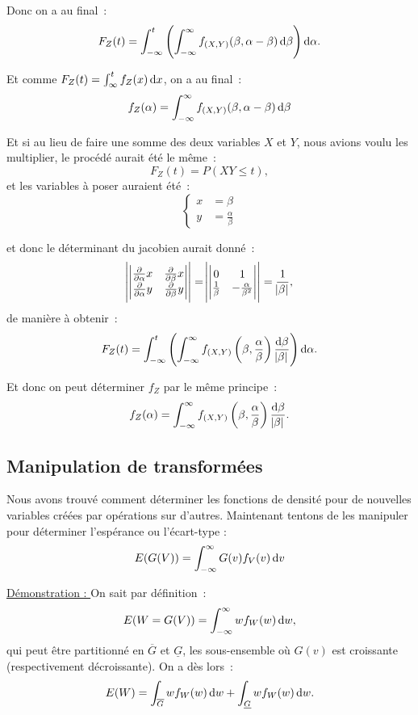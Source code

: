 \documentclass{article}
\renewcommand{\pd}[1]{\frac {\partial}{\partial #1}}
\begin{document}
			Donc on a au final~:
			\[F_Z(t) = \int_{-\infty}^t\left(\int_{-\infty}^\infty f_{(X, Y)}(\beta, \alpha - \beta)\dif \beta\right)\dif \alpha.\]

			Et comme $F_Z(t) = \int_{\infty}^t f_Z(x)\dif x$, on a au final~:
			\[f_Z(\alpha) = \int_{-\infty}^\infty f_{(X, Y)}(\beta, \alpha-\beta)\dif \beta\]

			Et si au lieu de faire une somme des deux variables $X$ et $Y$, nous avions voulu les multiplier, le procédé aurait été le même~:
			\[F_Z(t) = P(XY \leq t),\]
			et les variables à poser auraient été~:
			\[\left\{\begin{aligned}
				x &= \beta \\
				y &= \frac \alpha\beta
			\end{aligned}\right.\]

			et donc le déterminant du jacobien aurait donné~:
			\[\abs{\begin{vmatrix}\pd \alpha x & \pd \beta x \\ \pd \alpha y & \pd \beta y\end{vmatrix}}
				= \abs{\begin{vmatrix}0 & 1 \\ \frac 1\beta & -\frac \alpha{\beta^2}\end{vmatrix}} = \frac 1{\abs\beta},\]
			de manière à obtenir~:
			\[F_Z(t) = \int_{-\infty}^t\left(\int_{-\infty}^\infty f_{(X, Y)}\left(\beta, \frac \alpha\beta\right)\frac {\dif \beta}{\abs\beta}\right)\dif \alpha.\]

			Et donc on peut déterminer $f_Z$ par le même principe~:
			\[f_Z(\alpha) = \int_{-\infty}^\infty f_{(X, Y)}\left(\beta, \frac \alpha\beta\right)\frac {\dif\beta}{\abs\beta}.\]

	\subsection{Manipulation de transformées}
		Nous avons trouvé comment déterminer les fonctions de densité pour de nouvelles variables créées par opérations sur d'autres. Maintenant tentons de les manipuler
		pour déterminer l'espérance ou l'écart-type :
		\[E(G(V)) = \int_{-\infty}^\infty G(v)f_V(v)\dif v\]

		\underline{Démonstration : } On sait par définition~:
		\[E(W=G(V)) = \int_{-\infty}^\infty wf_W(w)\dif w,\]
		qui peut être partitionné en $\overline G$ et $\underline G$, les sous-ensemble où $G(v)$ est croissante (respectivement décroissante). On a dès lors~:
		\[E(W) = \int_{\overline G}wf_W(w)\dif w + \int_{\underline G}wf_W(w)\dif w.\]
\end{document}
